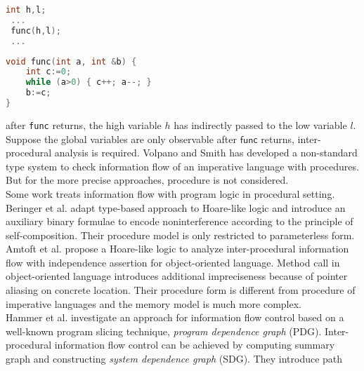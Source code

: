 \documentclass{llncs}
\begin{document}
\begin{minipage}[t]{4.8in}
\hspace*{1cm}
\begin{minipage}[lt]{3cm}
\begin{lstlisting}[language=C,basicstyle=\footnotesize]
 int h,l;
 ...
 func(h,l);
 ...
\end{lstlisting}
\end{minipage}
\begin{minipage}[r]{4.8cm}
\begin{lstlisting}[language=C,basicstyle=\footnotesize]
void func(int a, int &b) {
    int c:=0;
    while (a>0) { c++; a--; }
    b:=c;
}
\end{lstlisting}
\end{minipage}
\end{minipage}
after \texttt{func} returns, the \textsf{high} variable $h$ has
indirectly passed to the \textsf{low} variable $l$. Suppose the
global variables are only observable after $\textsf{func}$ returns,
inter-procedural analysis is required. Volpano and
Smith\cite{DBLP:conf/tapsoft/VolpanoS97} has developed a
non-standard type system to check information flow of an imperative
language with procedures. But for the more precise
approaches\cite{DBLP:conf/pldi/UnnoKY06}\cite{DBLP:conf/sas/TerauchiA05}\cite{DBLP:journals/fuin/FrancescoST03},
procedure is not considered.\\
\indent Some work treats information flow with program logic in
procedural setting. Beringer et al.\cite{DBLP:conf/csfw/BeringerH07}
adapt type-based approach to Hoare-like logic and introduce an
auxiliary binary formulae to encode noninterference according to the
principle of self-composition. Their procedure model is only
restricted to parameterless form. Amtoft et
al.\cite{DBLP:conf/popl/AmtoftBB06} propose a Hoare-like logic to
analyze inter-procedural information flow with independence
assertion for object-oriented language. Method call in
object-oriented language introduces additional impreciseness because
of pointer aliasing on concrete location. Their procedure form is
different from procedure of imperative languages and the memory
model is much more complex.\\
\indent Hammer et al.\cite{Hammer06informationflow} investigate an
approach for information flow control based on a well-known program
slicing technique, \emph{program dependence graph} (PDG).
Inter-procedural information flow control can be achieved by
computing summary graph and constructing \emph{system dependence
graph} (SDG). They introduce path
\end{document}
